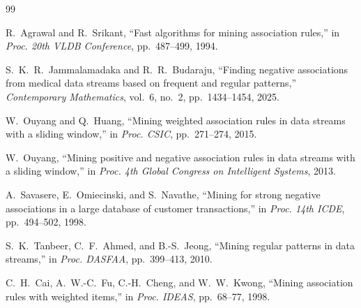 \documentclass[10pt,twocolumn]{article}
\begin{document}

\begin{thebibliography}{99}

R.~Agrawal and R.~Srikant,
``Fast algorithms for mining association rules,''
in \textit{Proc. 20th VLDB Conference}, pp.~487--499, 1994.

S.~K.~R.~Jammalamadaka and R.~R.~Budaraju,
``Finding negative associations from medical data streams based on
frequent and regular patterns,''
\textit{Contemporary Mathematics}, vol.~6, no.~2, pp.~1434--1454, 2025.

W.~Ouyang and Q.~Huang,
``Mining weighted association rules in data streams with a sliding
window,''
in \textit{Proc. CSIC}, pp.~271--274, 2015.

W.~Ouyang,
``Mining positive and negative association rules in data streams with
a sliding window,''
in \textit{Proc. 4th Global Congress on Intelligent Systems}, 2013.

A.~Savasere, E.~Omiecinski, and S.~Navathe,
``Mining for strong negative associations in a large database of
customer transactions,''
in \textit{Proc. 14th ICDE}, pp.~494--502, 1998.

S.~K.~Tanbeer, C.~F.~Ahmed, and B.-S.~Jeong,
``Mining regular patterns in data streams,''
in \textit{Proc. DASFAA}, pp.~399--413, 2010.

C.~H.~Cai, A.~W.-C.~Fu, C.-H.~Cheng, and W.~W.~Kwong,
``Mining association rules with weighted items,''
in \textit{Proc. IDEAS}, pp.~68--77, 1998.

\end{thebibliography}
\end{document}
